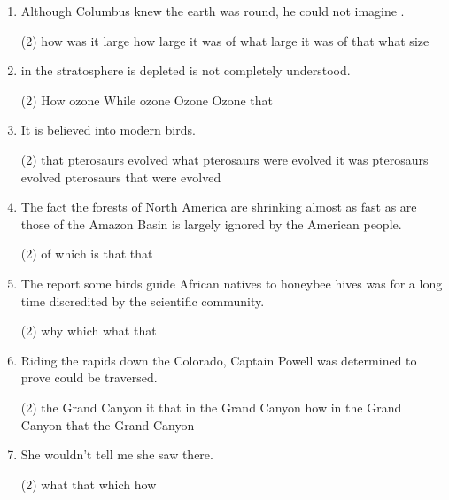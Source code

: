 \begin{enumerate}

\item Although Columbus knew the earth was round, he could not imagine \ttu.
\begin{tasks}(2)
  \task how was it large
  \task how large it was
  \task of what large it was
  \task of that what size
\end{tasks}

\item \ttu in the stratosphere is depleted is not completely understood.
\begin{tasks}(2)
  \task How ozone
  \task While ozone
  \task Ozone
  \task Ozone that
\end{tasks}

\item It is believed \ttu into modern birds.
\begin{tasks}(2)
  \task that pterosaurs evolved
  \task what pterosaurs were evolved
  \task it was pterosaurs evolved
  \task pterosaurs that were evolved
\end{tasks}

\item The fact \ttu the forests of North America are shrinking almost as fast as are those of the Amazon Basin is largely ignored by the American people.
\begin{tasks}(2)
  \task of
  \task which
  \task is that
  \task that
\end{tasks}

\item The report \ttu some birds guide African natives to honeybee hives was for a long time discredited by the scientific community.
\begin{tasks}(2)
  \task why
  \task which
  \task what
  \task that
\end{tasks}

\item Riding the rapids down the Colorado, Captain Powell was determined to prove \ttu could be traversed.
\begin{tasks}(2)
  \task the Grand Canyon it
  \task that in the Grand Canyon
  \task how in the Grand Canyon
  \task that the Grand Canyon
\end{tasks}

\item She wouldn't tell me \ttu she saw there.
\begin{tasks}(2)
  \task what
  \task that
  \task which
  \task how
\end{tasks}


\end{enumerate}
